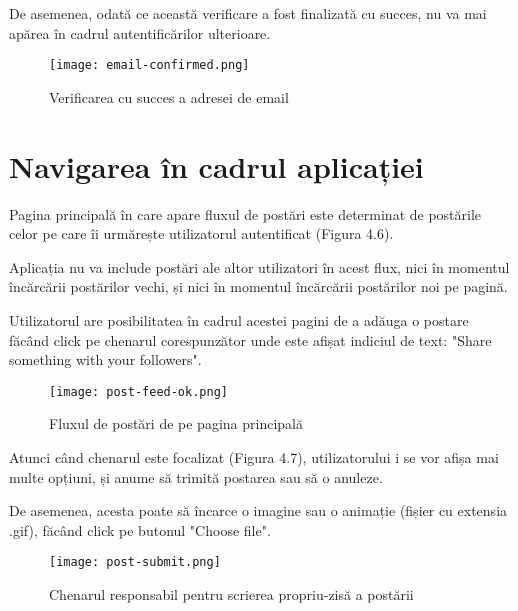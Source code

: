 De asemenea, odată ce această verificare a fost finalizată cu succes, nu va mai apărea în cadrul autentificărilor ulterioare.\newline
\bigskip

\begin{figure}[H]
	\begin{center}
		\texttt{[image: email-confirmed.png]}
		\caption{Verificarea cu succes a adresei de email}
	\end{center}
\end{figure}
\bigskip

\section{Navigarea în cadrul aplicației}

Pagina principală în care apare fluxul de postări este determinat de postările celor pe care îi urmărește utilizatorul autentificat (Figura 4.6).\newline
 
Aplicația nu va include postări ale altor utilizatori în acest flux, nici în momentul încărcării postărilor vechi, și nici în momentul încărcării postărilor noi pe pagină.\newline

Utilizatorul are posibilitatea în cadrul acestei pagini de a adăuga o postare făcând click pe chenarul corespunzător unde este afișat indiciul de text: "Share something with your followers".\newline
\bigskip

\begin{figure}[H]
	\begin{center}
		\texttt{[image: post-feed-ok.png]}
		\caption{Fluxul de postări de pe pagina principală}
	\end{center}
\end{figure}

Atunci când chenarul este focalizat (Figura 4.7), utilizatorului i se vor afișa mai multe opțiuni, și anume să trimită postarea sau să o anuleze.\newline

De asemenea, acesta poate să încarce o imagine sau o animație (fișier cu extensia .gif), făcând click pe butonul "Choose file".\newline
\bigskip

\begin{figure}[H]
	\begin{center}
		\texttt{[image: post-submit.png]}
		\caption{Chenarul responsabil pentru scrierea propriu-zisă a postării}
	\end{center}
\end{figure}

